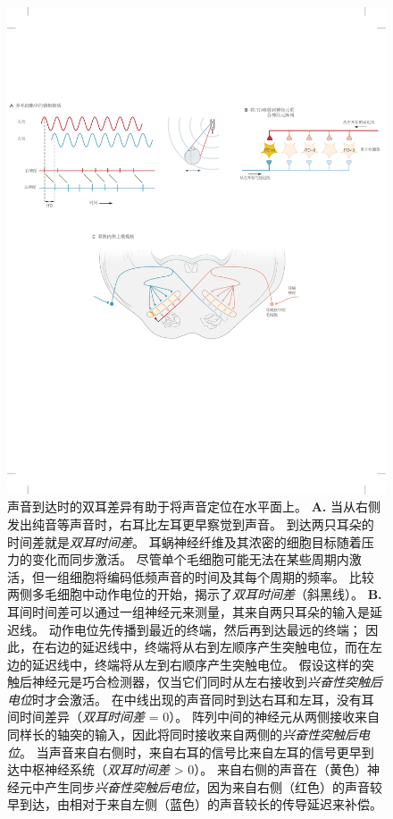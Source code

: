 \begin{figure}[htbp]
	\centering
	\includegraphics[width=0.9\linewidth]{chap28/fig_28_5}
	\caption{声音到达时的双耳差异有助于将声音定位在水平面上。
		\textbf{A.} 当从右侧发出纯音等声音时，右耳比左耳更早察觉到声音。 
		到达两只耳朵的时间差就是\textit{双耳时间差}。 
		耳蜗神经纤维及其浓密的细胞目标随着压力的变化而同步激活。
		尽管单个毛细胞可能无法在某些周期内激活，但一组细胞将编码低频声音的时间及其每个周期的频率。 
		比较两侧多毛细胞中动作电位的开始，揭示了\textit{双耳时间差}（斜黑线）。 
		\textbf{B.} 耳间时间差可以通过一组神经元来测量，其来自两只耳朵的输入是延迟线\cite{jeffress1948place}。
		动作电位先传播到最近的终端，然后再到达最远的终端；
		因此，在右边的延迟线中，终端将从右到左顺序产生突触电位，而在左边的延迟线中，终端将从左到右顺序产生突触电位。
		假设这样的突触后神经元是巧合检测器，仅当它们同时从左右接收到\textit{兴奋性突触后电位}时才会激活。
		在中线出现的声音同时到达右耳和左耳，没有耳间时间差异（\textit{双耳时间差} = 0）。
		阵列中间的神经元从两侧接收来自同样长的轴突的输入，因此将同时接收来自两侧的\textit{兴奋性突触后电位}。
		当声音来自右侧时，来自右耳的信号比来自左耳的信号更早到达中枢神经系统（\textit{双耳时间差} > 0）。
		来自右侧的声音在（黄色）神经元中产生同步\textit{兴奋性突触后电位}，因为来自右侧（红色）的声音较早到达，由相对于来自左侧（蓝色）的声音较长的传导延迟来补偿。
}
\end{figure}
